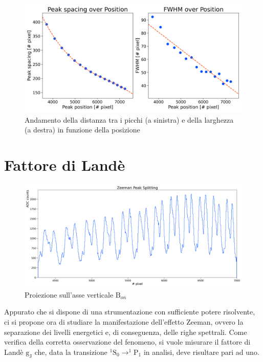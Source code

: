 \documentclass[twocolumn,10pt]{asme2ej}
\begin{document}
\begin{figure}
    \centering
    \includegraphics[width=\linewidth]{../Plots/Boff_spacing_trend.png}
    \caption{Andamento della distanza tra i picchi (a sinistra) e della larghezza (a destra) in funzione della posizione}
    \label{i:spacing_trend_Boff}
    \vspace{-10pt}
\end{figure}




\vspace{-10pt}
\section{Fattore di Landè}\label{s:lande}

\begin{figure}
    \centering
    \includegraphics[width=\textwidth]{../Plots/Bon_Y_proj.png}
    \caption{Proiezione sull'asse verticale $\text{B}_{on}$}
    \label{i:spettro2d_Bon_ProjY}
\end{figure}

Appurato che si dispone di una strumentazione con sufficiente potere risolvente, ci si propone ora di studiare la
manifestazione dell'effetto Zeeman, ovvero la separazione dei livelli energetici e, di conseguenza, delle righe
spettrali. Come verifica della corretta osservazione del fenomeno, si vuole misurare il fattore di Landè
$\text{g}_{\text{J}}$ che, data la transizione $^1\text{S}_0 \rightarrow ^1\text{P}_1$ in analisi, deve risultare pari
ad uno.
\end{document}

